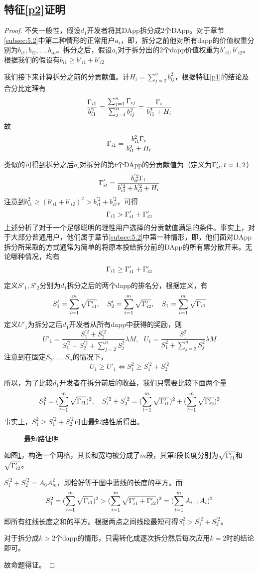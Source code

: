 \subsection{特征\ref{p2}证明}
\label{subsection:proof2}
\begin{proof}
	 不失一般性，假设$d_1$开发者将其DApp拆分成2个DApp。对于章节\ref{subsec:5.2}中第二种情形的正常用户$a_i$，即，拆分之前他对所有dapp的价值权重分别为$b_{i1},b_{i2},...,b_{in}$。拆分之后，假设$a_i$对于拆分出的$2$个dapp价值权重为$b'_{i1},b'_{i2}$。根据我们的假设有$b_{i1} \geq b'_{i1}+b'_{i2}$

	 我们接下来计算拆分之前的分贡献值。计$H_i = \sum_{j=2}^n b_{ij}^2$，根据特征\ref{p1}的结论及合分比定理有
	 $$\frac{\Gamma_{i1}}{b_{i1}^2} = \frac{\sum_{j=1}^n \Gamma_{ij}}{\sum_{j=1}^n b_{ij}^2} = \frac{\Gamma_i}{b_{i1}^2+H_i}$$
	 故
	 $$\Gamma_{i1}=\frac{b_{i1}^2\Gamma_i}{b_{i1}^2+H_i}$$

     类似的可得到拆分之后$a_i$对拆分的第$t$个DApp的分贡献值为（定义为$\Gamma'_{it},t=1,2$）
	 $$\Gamma'_{it} =  \frac{b_{it}^{'2}\Gamma_i}{b_{i1}^{'2}+b_{i2}^{'2}+H_i}$$
	 注意到$b_{i1}^2 \geq (b‘_{i1}+b’_{i2})^2 >b_{i1}^{'2}+b_{i2}^{'2}$，可得
	 $$\Gamma_{i1} > \Gamma'_{i1}+\Gamma'_{i2}$$
	 上述分析了对于一个足够聪明的理性用户选择的分贡献值满足的条件。事实上，对于大部分普通用户，他们属于章节\ref{subsec:5.2}中第一种情形，即，他们面对DApp拆分所采取的方式通常为简单的将原本投给拆分前的DApp的所有票分散开来。无论哪种情况，均有
	 	$$\Gamma_{i1} \geq \Gamma'_{i1}+\Gamma'_{i2}$$

	 定义$S'_1,S'_2$分别为$d_1$拆分之后的两个dapp的排名分，根据定义，有
	 $$S'_1 =  \sum_{i=1}^m \sqrt{\Gamma'_{i1}},~~~S'_2 =  \sum_{i=1}^m \sqrt{\Gamma'_{i2}},~~~S_1 = \sum_{i=1}^m \sqrt{\Gamma_{i1}}$$
	 定义$U'_1$为拆分之后$d_1$开发者从所有dapp中获得的奖励，则
	 $$U'_1=\frac{S_1^{'2}+S_2^{'2}}{S_1^{'2}+S_2^{'2}+\sum_{j=2}^n S_j^2} \lambda M,~~~U_1=\frac{S^2_1}{S_1^2+\sum_{j=2}^n S_j^2} \lambda M$$
	 注意到在固定$S_2,...,S_n$的情况下，
	 $$ U_1 \geq U'_1 \Leftrightarrow S_1^2 \geq S_1^{'2}+S_2^{'2}$$

	 所以，为了比较$d_1$开发者在拆分前后的收益，我们只需要比较下面两个量
	 $$S_1^2 = (\sum_{i=1}^m \sqrt{\Gamma_{i1}})^2,~~~S_1^{'2}+S_2^{'2}=  (\sum_{i=1}^m \sqrt{\Gamma'_{i1}})^2+(\sum_{i=1}^m \sqrt{\Gamma'_{i2}})^2$$
	 事实上，$S_1^2 \geq S_1^{'2}+S_2^{'2}$可由最短路性质得出。
	 \begin{figure}
	 	\centering
    
	 	\caption{最短路证明 \label{fig:path}}
	 \end{figure}
	 如图\ref{fig:path}，构造一个网格，其长和宽均被分成了$m$段，其第$i$段长度分别为$\sqrt{\Gamma'_{i1}}$和$\sqrt{\Gamma'_{i2}}$。

	 $S_1^{'2}+S_2^{'2}=A_0A_m^2$，即恰好等于图中蓝线的长度的平方。而
	 $$S_1^2 = (\sum_{i=1}^m \sqrt{\Gamma_{i1}})^2 > (\sum_{i=1}^m \sqrt{\Gamma'_{i1}+\Gamma'_{i2}})^2 = (\sum_{i=1}^m A_{i-1}A_i)^2$$
	 即所有红线长度之和的平方。根据两点之间线段最短可得$S_1^2 >S_1^{'2}+S_2^{'2}$。

	 对于拆分成$k>2$个dapp的情形，只需转化成逐次拆分然后每次应用$k=2$时的结论即可。

	 故命题得证。
\end{proof}

